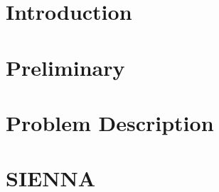 \documentclass[10pt,conference]{IEEEtran}
\begin{document}
\begin{abstract}
    
\end{abstract}

%

%

\maketitle
\IEEEdisplaynontitleabstractindextext
\IEEEpeerreviewmaketitle

\ifCLASSOPTIONcompsoc

\else
\section{Introduction}
\label{sec:introduction}
\fi


% 

\section{Preliminary}
\label{sec:background}


\section{Problem Description}
\label{sec:challenges}


\section{{SIENNA}}
\label{sec:sienna}

\end{document}
